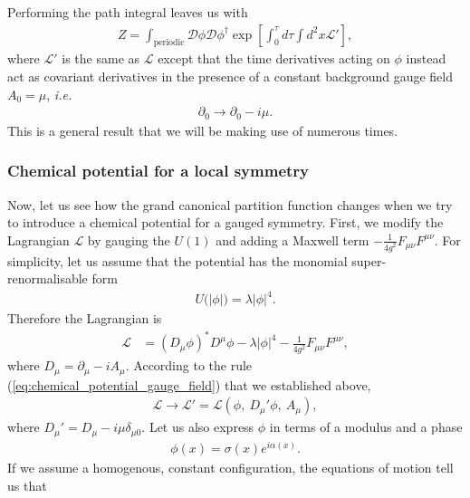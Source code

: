         Performing the path integral leaves us with
        \begin{align}
            Z= \int_{\text{periodic}} \mathcal{D}\phi \mathcal{D}\phi^{\dag} \exp \left[\int_0^{\tau} d\tau \int d^2x \mathcal{L'} \right],
        \end{align}
        where $\mathcal{L'}$ is the same as $\mathcal{L}$ except that the time derivatives acting on $\phi$ instead act as covariant derivatives in the presence of a constant background gauge field $A_0=\mu$, \textit{i.e.}
        \begin{align}
            \partial_0 \rightarrow \partial_0 -i \mu. \label{eq:chemical_potential_gauge_field}
        \end{align}
        This is a general result that we will be making use of numerous times.
        \subsubsection*{Chemical potential for a local symmetry}
        Now, let us see how the grand canonical partition function changes when we try to introduce a chemical potential for a gauged symmetry. First, we modify the Lagrangian $\mathcal{L}$ by gauging the $U(1)$ and adding a Maxwell term $-\frac{1}{4 g^2} F_{\mu \nu} F^{\mu \nu}$. For simplicity, let us assume that the potential has the monomial super-renormalisable form
        \begin{align}
            U\big(|\phi| \big) = \lambda |\phi|^4.
        \end{align}
        Therefore the Lagrangian is
        \begin{align}
            \mathcal{L} &=( D_{\mu} \phi)^* D^{\mu} \phi - \lambda |\phi|^4 - \frac{1}{4 g^2}F_{\mu \nu} F^{\mu \nu},
        \end{align}
        where $D_{\mu}= \partial_{\mu} - i A_{\mu}$. According to the rule (\ref{eq:chemical_potential_gauge_field}) that we established above,
        \begin{align}
            \mathcal{L} \rightarrow \mathcal{L}'= \mathcal{L}\left(\phi,\ D_{\mu}' \phi,\ A_{\mu} \right),
        \end{align}
        where $D_{\mu}' = D_{\mu} - i \mu \delta_{\mu 0}$.
        Let us also express $\phi$ in terms of a modulus and a phase
        \begin{align}
            \phi(x) = \sigma(x) e^{i \alpha(x)}.
        \end{align}
        If we assume a homogenous, constant configuration, the equations of motion tell us that
